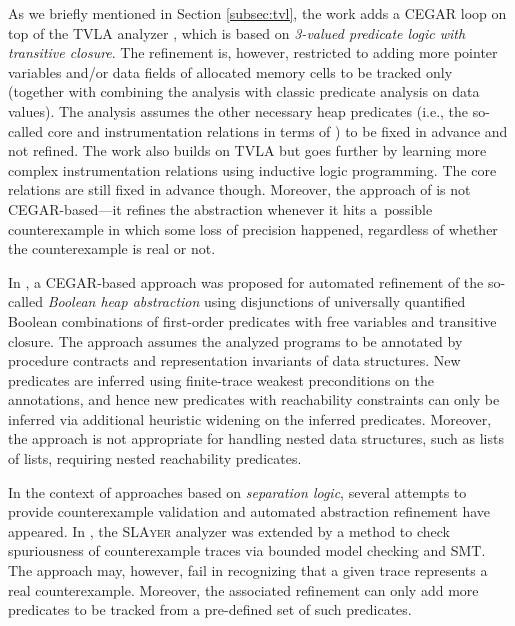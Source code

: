 	  As we briefly mentioned in Section \ref{subsec:tvl},
	  the work \cite{beyer:lazy_shape_analysis} adds a CEGAR loop on top of the TVLA
	  analyzer \cite{pale}, which is based on \emph{3-valued predicate logic with
	  transitive closure}. The refinement is, however, restricted to adding more
	  pointer variables and/or data fields of allocated memory cells to be tracked
	  only (together with combining the ana\-ly\-sis with classic predicate analysis on
	  data values). The analysis assumes the other necessary heap predicates (i.e.,
	  the so-called core and instrumentation relations in terms of \cite{pale}) to
	  be fixed in advance and not refined.
	  The work \cite{Loginov:AbstrRefViaInductLearning:05} also builds on TVLA but goes
	  further by learning more complex instrumentation relations using
	  inductive logic programming. The core relations are still fixed in
	  advance though. Moreover, the approach of
	  \cite{Loginov:AbstrRefViaInductLearning:05} is not CEGAR-based---it refines the
	  abstraction whenever it hits a~possible counterexample in which
	  some loss of precision happened, regardless of whether the counterexample is
	  real or not.

	  In \cite{podelski:popl10}, a CEGAR-based approach was proposed for automated
	  refinement of the so-called \emph{Boolean heap abstraction} using disjunctions
	  of universally quantified Boolean combinations of first-order predicates with
	  free variables and transitive closure.
	  The approach assumes the analyzed programs to be annotated by
	  procedure contracts and representation invariants of data structures. New
	  predicates are inferred using finite-trace weakest preconditions on the
	  annotations, and hence new predicates with reachability constraints can only be
	  inferred via additional heuristic widening on the inferred predicates. Moreover,
	  the approach is not appropriate for handling nested data structures, such as
	  lists of lists, requiring nested reachability predicates.

	  In the context of approaches based on \emph{separation logic}, several attempts
	  to provide counterexample validation and automated abstraction refinement have
	  appeared. In \cite{slayer12}, the \textsc{SLAyer} analyzer was extended by a method to
	  check spuriousness of counterexample traces via bounded model checking and SMT.
	  The approach may, however, fail in recognizing that a given
	  trace represents a real counterexample. Moreover, the associated refinement can
	  only add more predicates to be tracked from a pre-defined set of such
	  predicates.
	  
